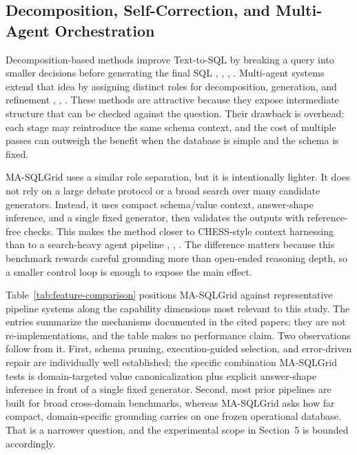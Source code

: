 \documentclass{ieeeaccess}
\begin{document}
\subsection{Decomposition, Self-Correction, and Multi-Agent Orchestration}\label{decomposition-self-correction-and-multi-agent-orchestration}

Decomposition-based methods improve Text-to-SQL by breaking a query into smaller decisions before generating the final SQL \cite{liu2023divide}, \cite{pourreza2023dinsql}, \cite{arora2023adapt}, \cite{xie2024decomposition}. Multi-agent systems extend that idea by assigning distinct roles for decomposition, generation, and refinement \cite{wang2023macsql}, \cite{xie2024magsql}, \cite{cen2025sqlfixagent}. These methods are attractive because they expose intermediate structure that can be checked against the question. Their drawback is overhead: each stage may reintroduce the same schema context, and the cost of multiple passes can outweigh the benefit when the database is simple and the schema is fixed.

MA-SQLGrid uses a similar role separation, but it is intentionally lighter. It does not rely on a large debate protocol or a broad search over many candidate generators. Instead, it uses compact schema/value context, answer-shape inference, and a single fixed generator, then validates the outputs with reference-free checks. This makes the method closer to CHESS-style context harnessing than to a search-heavy agent pipeline \cite{talaei2024chess}, \cite{wang2023macsql}, \cite{pourreza2023dinsql}. The difference matters because this benchmark rewards careful grounding more than open-ended reasoning depth, so a smaller control loop is enough to expose the main effect.

Table~\ref{tab:feature-comparison} positions MA-SQLGrid against representative pipeline systems along the capability dimensions most relevant to this study. The entries summarize the mechanisms documented in the cited papers; they are not re-implementations, and the table makes no performance claim. Two observations follow from it. First, schema pruning, execution-guided selection, and error-driven repair are individually well established; the specific combination MA-SQLGrid tests is domain-targeted value canonicalization plus explicit answer-shape inference in front of a single fixed generator. Second, most prior pipelines are built for broad cross-domain benchmarks, whereas MA-SQLGrid asks how far compact, domain-specific grounding carries on one frozen operational database. That is a narrower question, and the experimental scope in Section~5 is bounded accordingly.
\end{document}
